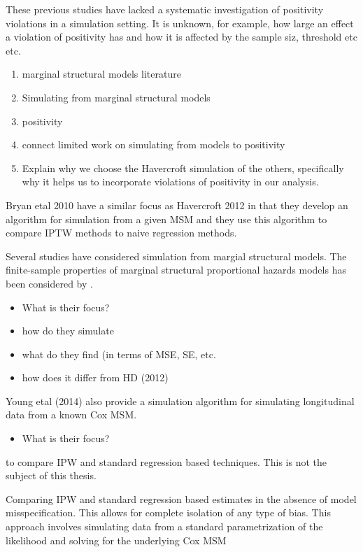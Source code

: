 \documentclass[11pt]{article}
\providecommand{\tightlist}{%
      \setlength{\itemsep}{0pt}\setlength{\parskip}{0pt}}
\begin{document}
These previous studies have lacked a systematic investigation of
positivity violations in a simulation setting. It is unknown, for
example, how large an effect a violation of positivity has and how it is
affected by the sample siz, threshold etc etc.

\begin{enumerate}
\def\labelenumi{\arabic{enumi}.}
\item
  marginal structural models literature
\item
  Simulating from marginal structural models
\item
  positivity
\item
  connect limited work on simulating from models to positivity
\item
  Explain why we choose the Havercroft simulation of the others,
  specifically why it helps us to incorporate violations of positivity
  in our analysis.
\end{enumerate}

Bryan etal 2010 have a similar focus as Havercroft 2012 in that they
develop an algorithm for simulation from a given MSM and they use this
algorithm to compare IPTW methods to naive regression methods.

Several studies have considered simulation from margial structural
models. The finite-sample properties of marginal structural proportional
hazards models has been considered by \citet{Westreich2009}.

\begin{itemize}
\tightlist
\item
  What is their focus?
\item
  how do they simulate
\item
  what do they find (in terms of MSE, SE, etc.
\item
  how does it differ from HD (2012)
\end{itemize}

Young etal (2014) also provide a simulation algorithm for simulating
longitudinal data from a known Cox MSM.

\begin{itemize}
\tightlist
\item
  What is their focus?
\end{itemize}

to compare IPW and standard regression based techniques. This is not the
subject of this thesis.

Comparing IPW and standard regression based estimates in the absence of
model misspecification. This allows for complete isolation of any type
of bias. This approach involves simulating data from a standard
parametrization of the likelihood and solving for the underlying Cox MSM
\end{document}
